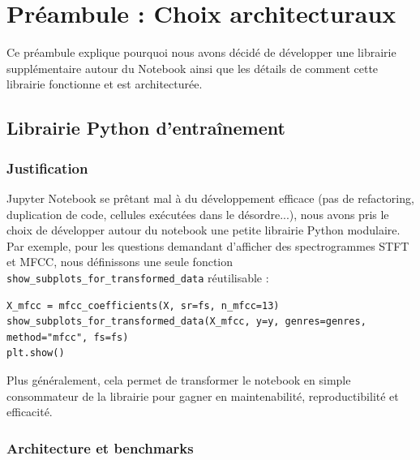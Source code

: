 \documentclass{name}
\begin{document}
\par 
\setcounter{page}{\value{pagezero}}

\newpage
\setcounter{page}{\value{pagezero}}
\tableofcontents

\newpage
\section{Préambule : Choix architecturaux}

Ce préambule explique pourquoi nous avons décidé de développer une librairie supplémentaire autour du Notebook ainsi que les détails de comment cette librairie fonctionne et est architecturée.

\subsection{Librairie Python d'entraînement}

\subsubsection{Justification}

Jupyter Notebook se prêtant mal à du développement efficace (pas de refactoring, duplication de code, cellules exécutées dans le désordre...), nous avons pris le choix de développer autour du notebook une petite librairie Python modulaire. Par exemple, pour les questions demandant d'afficher des spectrogrammes STFT et MFCC, nous définissons une seule fonction \texttt{show\_subplots\_for\_transformed\_data} réutilisable :

\begin{lstlisting}[caption={Exemple d'appel API pour les spectrogrammes MFCC}]
X_mfcc = mfcc_coefficients(X, sr=fs, n_mfcc=13)
show_subplots_for_transformed_data(X_mfcc, y=y, genres=genres, method="mfcc", fs=fs)
plt.show()
\end{lstlisting}

Plus généralement, cela permet de transformer le notebook en simple consommateur de la librairie pour gagner en maintenabilité, reproductibilité et efficacité.

\subsubsection{Architecture et benchmarks}
\end{document}
